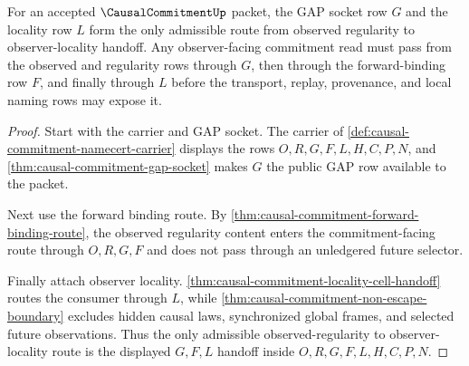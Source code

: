 \begin{theorem}
\label{thm:causal-commitment-gap-locality-adjunction}
For an accepted $\CausalCommitmentUp$ packet, the GAP socket row $G$ and the
locality row $L$ form the only admissible route from observed regularity to
observer-locality handoff. Any observer-facing commitment read must pass from
the observed and regularity rows through $G$, then through the forward-binding
row $F$, and finally through $L$ before the transport, replay, provenance, and
local naming rows may expose it.
\end{theorem}
\begin{proof}
Start with the carrier and GAP socket. The carrier of
\autoref{def:causal-commitment-namecert-carrier} displays the rows
$O,R,G,F,L,H,C,P,N$, and \autoref{thm:causal-commitment-gap-socket} makes $G$
the public GAP row available to the packet.

Next use the forward binding route. By
\autoref{thm:causal-commitment-forward-binding-route}, the observed
regularity content enters the commitment-facing route through $O,R,G,F$ and
does not pass through an unledgered future selector.

Finally attach observer locality. \autoref{thm:causal-commitment-locality-cell-handoff}
routes the consumer through $L$, while
\autoref{thm:causal-commitment-non-escape-boundary} excludes hidden causal
laws, synchronized global frames, and selected future observations. Thus the
only admissible observed-regularity to observer-locality route is the
displayed $G,F,L$ handoff inside $O,R,G,F,L,H,C,P,N$.
\end{proof}

